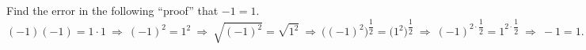 Find the error in the following ``proof'' that $-1=1$.
\[
(-1)(-1)=1\cdot1\ \Rightarrow\ (-1)^2=1^2\ \Rightarrow\ \sqrt{(-1)^2}=\sqrt{1^2}\ \Rightarrow\ \bigl((-1)^2\bigr)^{\dfrac{1}{2}}=\bigl(1^2\bigr)^{\dfrac{1}{2}}\ \Rightarrow\ (-1)^{2\cdot\dfrac{1}{2}}=1^{2\cdot\dfrac{1}{2}}\ \Rightarrow\ -1=1 .
\]
